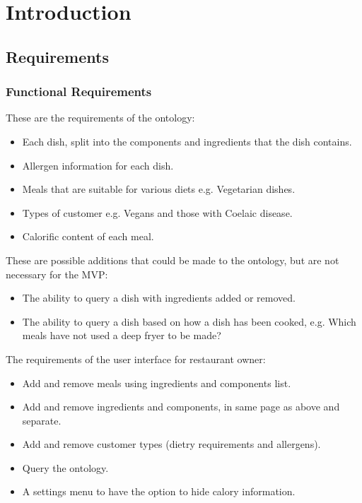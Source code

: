 \chapter{Introduction}

\section{Requirements}

\subsection{Functional Requirements}

These are the requirements of the ontology:

\begin{itemize}
\item Each dish, split into the components and ingredients that the dish contains.
\item Allergen information for each dish.
\item Meals that are suitable for various diets e.g. Vegetarian dishes.
\item Types of customer e.g. Vegans and those with Coelaic disease.
\item Calorific content of each meal.
\end{itemize}

These are possible additions that could be made to the ontology, but are not necessary for the MVP:

\begin{itemize}
\item The ability to query a dish with ingredients added or removed.
\item The ability to query a dish based on how a dish has been cooked, e.g. Which meals have not used a deep fryer to be made?
\end{itemize}

The requirements of the user interface for restaurant owner:

\begin{itemize}
\item Add and remove meals using ingredients and components list.
\item Add and remove ingredients and components, in same page as above and separate.
\item Add and remove customer types (dietry requirements and allergens).
\item Query the ontology.
\item A settings menu to have the option to hide calory information.
\end{itemize}

